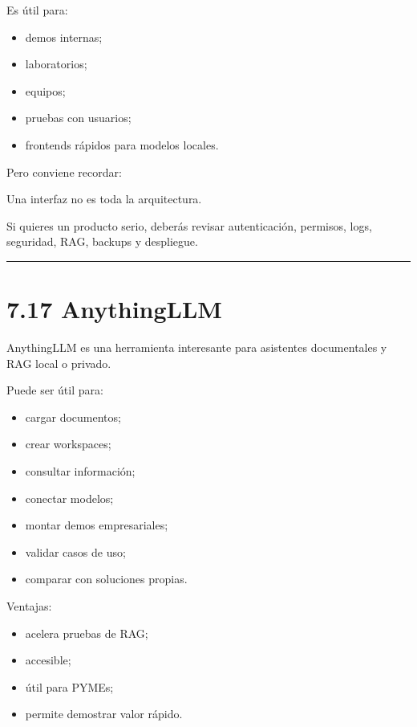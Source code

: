 Es útil para:

\begin{itemize}
\tightlist
\item
  demos internas;
\item
  laboratorios;
\item
  equipos;
\item
  pruebas con usuarios;
\item
  frontends rápidos para modelos locales.
\end{itemize}

Pero conviene recordar:

Una interfaz no es toda la arquitectura.

Si quieres un producto serio, deberás revisar autenticación, permisos,
logs, seguridad, RAG, backups y despliegue.

\begin{center}\rule{0.5\linewidth}{0.5pt}\end{center}

\section{7.17 AnythingLLM}\label{anythingllm}

AnythingLLM es una herramienta interesante para asistentes documentales
y RAG local o privado.

Puede ser útil para:

\begin{itemize}
\tightlist
\item
  cargar documentos;
\item
  crear workspaces;
\item
  consultar información;
\item
  conectar modelos;
\item
  montar demos empresariales;
\item
  validar casos de uso;
\item
  comparar con soluciones propias.
\end{itemize}

Ventajas:

\begin{itemize}
\tightlist
\item
  acelera pruebas de RAG;
\item
  accesible;
\item
  útil para PYMEs;
\item
  permite demostrar valor rápido.
\end{itemize}

